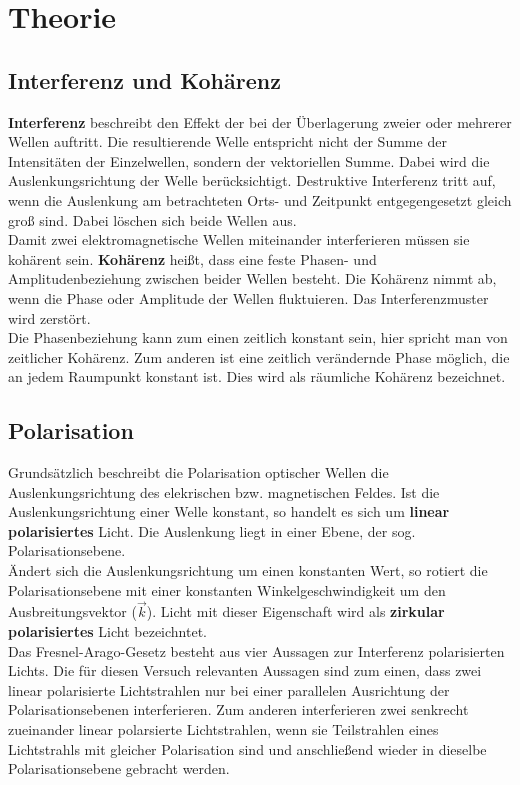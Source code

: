 \section{Theorie}
\label{sec:Theorie}

\subsection{Interferenz und Kohärenz}
\textbf{Interferenz} beschreibt den Effekt der bei der Überlagerung zweier oder mehrerer Wellen auftritt.
Die resultierende Welle entspricht nicht der Summe der Intensitäten der Einzelwellen, sondern der vektoriellen Summe.
Dabei wird die Auslenkungsrichtung der Welle berücksichtigt.
Destruktive Interferenz tritt auf, wenn die Auslenkung am betrachteten Orts- und Zeitpunkt entgegengesetzt gleich groß sind.
Dabei löschen sich beide Wellen aus.
\\
Damit zwei elektromagnetische Wellen miteinander interferieren müssen sie kohärent sein.
\textbf{Kohärenz} heißt, dass eine feste Phasen- und Amplitudenbeziehung zwischen beider Wellen besteht.
Die Kohärenz nimmt ab, wenn die Phase oder Amplitude der Wellen fluktuieren.
Das Interferenzmuster wird zerstört.
\\
Die Phasenbeziehung kann zum einen zeitlich konstant sein, hier spricht man von zeitlicher Kohärenz.
Zum anderen ist eine zeitlich verändernde Phase möglich, die an jedem Raumpunkt konstant ist.
Dies wird als räumliche Kohärenz bezeichnet.

\subsection{Polarisation}
Grundsätzlich beschreibt die Polarisation optischer Wellen die Auslenkungsrichtung des elekrischen bzw. magnetischen Feldes.
Ist die Auslenkungsrichtung einer Welle konstant, so handelt es sich um \textbf{linear polarisiertes} Licht.
Die Auslenkung liegt in einer Ebene, der sog. Polarisationsebene.
\\
Ändert sich die Auslenkungsrichtung um einen konstanten Wert, so rotiert die Polarisationsebene mit einer konstanten Winkelgeschwindigkeit um den Ausbreitungsvektor ($\vec{k}$).
Licht mit dieser Eigenschaft wird als \textbf{zirkular polarisiertes} Licht bezeichntet.
\\
Das Fresnel-Arago-Gesetz\cite{hecht2018optik} besteht aus vier Aussagen zur Interferenz polarisierten Lichts.
Die für diesen Versuch relevanten Aussagen sind zum einen, dass zwei linear polarisierte Lichtstrahlen nur bei einer parallelen Ausrichtung der Polarisationsebenen interferieren.
Zum anderen interferieren zwei senkrecht zueinander linear polarsierte Lichtstrahlen, wenn sie Teilstrahlen eines Lichtstrahls mit gleicher Polarisation sind und anschließend wieder in dieselbe Polarisationsebene gebracht werden.


